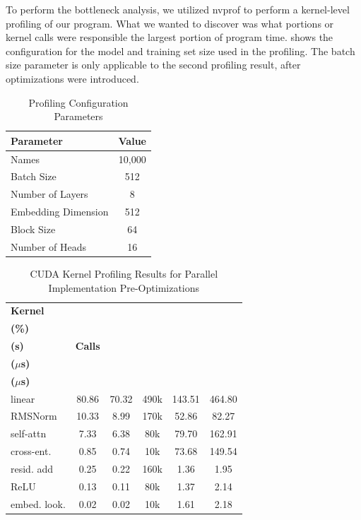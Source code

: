 To perform the bottleneck analysis, we utilized nvprof to perform a kernel-level profiling of our program. What we wanted to discover was what portions or kernel calls 
were responsible the largest portion of program time.  shows the configuration for the model and training set size used in the profiling. The batch size
parameter is only applicable to the second profiling result, after optimizations were introduced.
\begin{table}[H]
\centering
\small
\renewcommand{\arraystretch}{1.2}
\setlength{\tabcolsep}{6pt}
\begin{tabular}{lc}
\hline
\textbf{Parameter} & \textbf{Value} \\
\hline
Names               & 10{,}000 \\
Batch Size          & 512 \\
Number of Layers    & 8 \\
Embedding Dimension & 512 \\
Block Size          & 64 \\
Number of Heads     & 16 \\
\hline
\end{tabular}
\caption{Profiling Configuration Parameters}
\label{tab:profile_config}
\end{table}

\begin{table}[t]
\centering
\scriptsize
\renewcommand{\arraystretch}{1.1}
\setlength{\tabcolsep}{4pt}
\begin{tabular}{lccccc}
\hline
\textbf{Kernel} & \makecell{\textbf{Time} \\ \textbf{(\%)}} & \makecell{\textbf{Total} \\ \textbf{(s)}} & \textbf{Calls} & \makecell{\textbf{Avg} \\ \textbf{($\mu$s)}} & \makecell{\textbf{Max} \\ \textbf{($\mu$s)}} \\
\hline
linear & 80.86 & 70.32 & 490k & 143.51 & 464.80 \\
RMSNorm & 10.33 & 8.99 & 170k & 52.86 & 82.27 \\
self-attn & 7.33 & 6.38 & 80k & 79.70 & 162.91 \\
cross-ent. & 0.85 & 0.74 & 10k & 73.68 & 149.54 \\
resid. add & 0.25 & 0.22 & 160k & 1.36 & 1.95 \\
ReLU & 0.13 & 0.11 & 80k & 1.37 & 2.14 \\
embed. look. & 0.02 & 0.02 & 10k & 1.61 & 2.18 \\
\hline
\end{tabular}
\caption{CUDA Kernel Profiling Results for Parallel Implementation Pre-Optimizations}
\label{tab:profile_pre_optimization}
\end{table}


